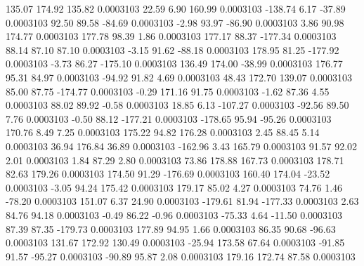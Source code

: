       135.07      174.92      135.82     0.0003103
       22.59        6.90      160.99     0.0003103
     -138.74        6.17      -37.89     0.0003103
       92.50       89.58      -84.69     0.0003103
       -2.98       93.97      -86.90     0.0003103
        3.86       90.98      174.77     0.0003103
      177.78       98.39        1.86     0.0003103
      177.17       88.37     -177.34     0.0003103
       88.14       87.10       87.10     0.0003103
       -3.15       91.62      -88.18     0.0003103
      178.95       81.25     -177.92     0.0003103
       -3.73       86.27     -175.10     0.0003103
      136.49      174.00      -38.99     0.0003103
      176.77       95.31       84.97     0.0003103
      -94.92       91.82        4.69     0.0003103
       48.43      172.70      139.07     0.0003103
       85.00       87.75     -174.77     0.0003103
       -0.29      171.16       91.75     0.0003103
       -1.62       87.36        4.55     0.0003103
       88.02       89.92       -0.58     0.0003103
       18.85        6.13     -107.27     0.0003103
      -92.56       89.50        7.76     0.0003103
       -0.50       88.12     -177.21     0.0003103
     -178.65       95.94      -95.26     0.0003103
      170.76        8.49        7.25     0.0003103
      175.22       94.82      176.28     0.0003103
        2.45       88.45        5.14     0.0003103
       36.94      176.84       36.89     0.0003103
     -162.96        3.43      165.79     0.0003103
       91.57       92.02        2.01     0.0003103
        1.84       87.29        2.80     0.0003103
       73.86      178.88      167.73     0.0003103
      178.71       82.63      179.26     0.0003103
      174.50       91.29     -176.69     0.0003103
      160.40      174.04      -23.52     0.0003103
       -3.05       94.24      175.42     0.0003103
      179.17       85.02        4.27     0.0003103
       74.76        1.46      -78.20     0.0003103
      151.07        6.37       24.90     0.0003103
     -179.61       81.94     -177.33     0.0003103
        2.63       84.76       94.18     0.0003103
       -0.49       86.22       -0.96     0.0003103
      -75.33        4.64      -11.50     0.0003103
       87.39       87.35     -179.73     0.0003103
      177.89       94.95        1.66     0.0003103
       86.35       90.68      -96.63     0.0003103
      131.67      172.92      130.49     0.0003103
      -25.94      173.58       67.64     0.0003103
      -91.85       91.57      -95.27     0.0003103
      -90.89       95.87        2.08     0.0003103
      179.16      172.74       87.58     0.0003103
